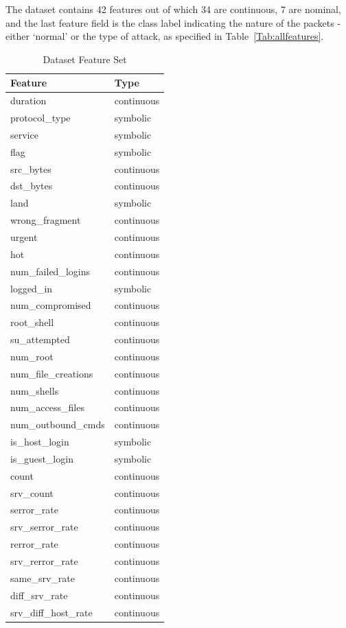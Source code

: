 \documentclass[11pt]{article}
\begin{document}
The dataset contains 42 features out of which 34 are continuous, 7 are nominal, and the last feature field is the class label indicating the nature of the packets - either `normal' or the type of attack, as specified in Table~\ref{Tab:allfeatures}.

\begin{table}
\caption{Dataset Feature Set}
\centering
\begin{tabular}{ll}
Feature & Type \\
\hline
duration & continuous \\
protocol\_type & symbolic \\
service & symbolic \\
flag & symbolic \\
src\_bytes & continuous \\
dst\_bytes & continuous \\
land & symbolic \\
wrong\_fragment & continuous \\
urgent & continuous \\
hot & continuous \\
num\_failed\_logins & continuous \\
logged\_in & symbolic \\
num\_compromised & continuous \\
root\_shell & continuous \\
su\_attempted & continuous \\
num\_root & continuous \\
num\_file\_creations & continuous \\
num\_shells\ & continuous \\
num\_access\_files & continuous \\
num\_outbound\_cmds & continuous \\
is\_host\_login & symbolic \\
is\_guest\_login & symbolic \\
count & continuous \\
srv\_count & continuous \\
serror\_rate & continuous \\
srv\_serror\_rate & continuous \\
rerror\_rate & continuous \\
srv\_rerror\_rate & continuous \\
same\_srv\_rate & continuous \\
diff\_srv\_rate & continuous \\
srv\_diff\_host\_rate & continuous \\

\end{tabular}
\end{table}
\end{document}
